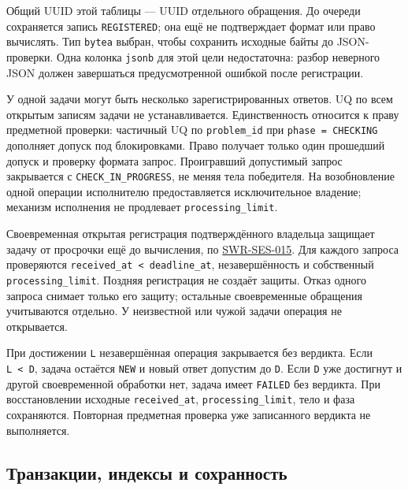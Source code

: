 \documentclass[12pt,a4paper]{article}
\begin{document}
Общий UUID этой таблицы --- UUID отдельного обращения. До очереди сохраняется запись \texttt{REGISTERED}; она ещё не подтверждает формат или право вычислять. Тип \texttt{bytea} выбран, чтобы сохранить исходные байты до JSON-проверки. Одна колонка \texttt{jsonb} для этой цели недостаточна: разбор неверного JSON должен завершаться предусмотренной ошибкой после регистрации.

У одной задачи могут быть несколько зарегистрированных ответов. UQ по всем открытым записям задачи не устанавливается. Единственность относится к праву предметной проверки: частичный UQ по \texttt{problem\_id} при \texttt{phase\ =\ CHECKING} дополняет допуск под блокировками. Право получает только один прошедший допуск и проверку формата запрос. Проигравший допустимый запрос закрывается с \texttt{CHECK\_\allowbreak{}IN\_\allowbreak{}PROGRESS}, не меняя тела победителя. На возобновление одной операции исполнителю предоставляется исключительное владение; механизм исполнения не продлевает \texttt{processing\_\allowbreak{}limit}.

Своевременная открытая регистрация подтверждённого владельца защищает задачу от просрочки ещё до вычисления, по {\href{DOC-06.2\_Сессии\_задач\_и\_планировщик.pdf\#swr-ses-015}{SWR-SES-015}}. Для каждого запроса проверяются \texttt{received\_\allowbreak{}at < deadline\_\allowbreak{}at}, незавершённость и собственный \texttt{processing\_\allowbreak{}limit}. Поздняя регистрация не создаёт защиты. Отказ одного запроса снимает только его защиту; остальные своевременные обращения учитываются отдельно. У неизвестной или чужой задачи операция не открывается.

При достижении \texttt{L} незавершённая операция закрывается без вердикта. Если \texttt{L\ \textless{}\ D}, задача остаётся \texttt{NEW} и новый ответ допустим до \texttt{D}. Если \texttt{D} уже достигнут и другой своевременной обработки нет, задача имеет \texttt{FAILED} без вердикта. При восстановлении исходные \texttt{received\_\allowbreak{}at}, \texttt{processing\_\allowbreak{}limit}, тело и фаза сохраняются. Повторная предметная проверка уже записанного вердикта не выполняется.

\subsection{Транзакции, индексы и сохранность}\label{ux442ux440ux430ux43dux437ux430ux43aux446ux438ux438-ux438ux43dux434ux435ux43aux441ux44b-ux438-ux441ux43eux445ux440ux430ux43dux43dux43eux441ux442ux44c}
\end{document}
